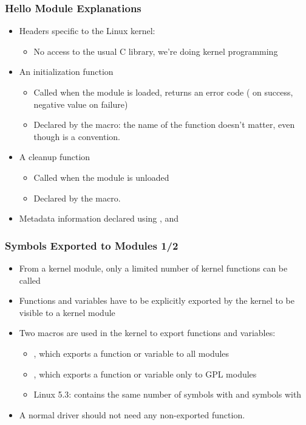 \begin{frame}
  \frametitle{Hello Module Explanations}
  \begin{itemize}
  \item Headers specific to the Linux kernel: 
    \begin{itemize}
    \item No access to the usual C library, we're doing kernel
      programming
    \end{itemize}
  \item An initialization function
    \begin{itemize}
    \item Called when the module is loaded, returns an error code
      ( on success, negative value on failure)
    \item Declared by the  macro: the name of the
      function doesn't matter, even though 
      is a convention.
    \end{itemize}
  \item A cleanup function
    \begin{itemize}
    \item Called when the module is unloaded
    \item Declared by the  macro.
    \end{itemize}
  \item Metadata information declared using ,
     and 
  \end{itemize}
\end{frame}

\begin{frame}
  \frametitle{Symbols Exported to Modules 1/2}
  \begin{itemize}
  \item From a kernel module, only a limited number of kernel
    functions can be called
  \item Functions and variables have to be explicitly exported by the
    kernel to be visible to a kernel module
  \item Two macros are used in the kernel to export functions and
    variables:
    \begin{itemize}
    \item {}, which exports a function
      or variable to all modules
    \item {}, which exports a
      function or variable only to GPL modules
    \item Linux 5.3: contains the same number of symbols with
       and symbols with 
    \end{itemize}
  \item A normal driver should not need any non-exported function.
  \end{itemize}
\end{frame}

